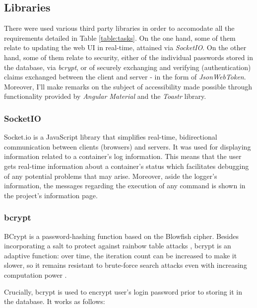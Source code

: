 \documentclass[multi, tikz, a4paper, oneside]{article}
\begin{document}
\subsection{Libraries}
There were used various third party libraries in order to accomodate all the
requirements detailed in Table \ref{table:tasks}. On the one hand, some of them
relate to updating the web UI in real-time, attained via {\em{SocketIO}}. On the
other hand, some of them relate to security, either of the individual passwords
stored in the database, via {\em{bcrypt}}, or of securely exchanging and
verifying (authentication) claims exchanged between the client and server - in
the form of {\em{JsonWebToken}}. Moreover, I'll make remarks on the subject of
accessibility made possible through functionality provided by {\em{Angular
    Material}} and the {\em{Toastr}} library.

\subsubsection{SocketIO}
Socket.io is a JavaScript library that simplifies real-time, bidirectional
communication between clients (browsers) and servers. It was used for displaying
information related to a container's log information. This means that the user
gets real-time information about a container's status which facilitates
debugging of any potential problems that may arise. Moreover, aside the logger's
information, the messages regarding the execution of any command is shown in the
project's information page.


\subsubsection{bcrypt}\label{sec:bcrypt}
BCrypt is a password-hashing function based on the Blowfish cipher. Besides
incorporating a salt to protect against rainbow table
attacks \autocite{wiki:rainbow-attacks}, bcrypt is an adaptive function: over
time, the iteration count can be increased to make it slower, so it remains
resistant to brute-force search attacks even with increasing computation power
\autocite{wiki:Bcrypt}.

Crucially, bcrypt is used to encrypt user's login password prior to storing it
in the database. It works as follows:
\end{document}
